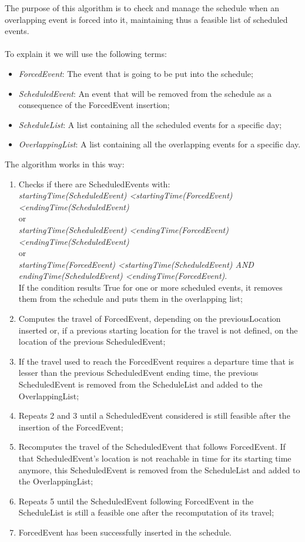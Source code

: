 The purpose of this algorithm is to check and manage the schedule when an overlapping event is forced into it, maintaining thus a feasible list of scheduled events. \\ \\
To explain it we will use the following terms: 
\begin{itemize}
	\item \textit{ForcedEvent}: The event that is going to be put into the schedule;
	\item \textit{ScheduledEvent}: An event that will be removed from the schedule as a consequence of the ForcedEvent insertion;
	\item \textit{ScheduleList}: A list containing all the scheduled events for a specific day;
	\item \textit{OverlappingList}: A list containing all the overlapping events for a specific day.
\end{itemize}
\newpage
\noindent The algorithm works in this way:
\begin{enumerate}
	\item Checks if there are ScheduledEvents with: \\ \textit{startingTime(ScheduledEvent) \textless startingTime(ForcedEvent) \textless endingTime(ScheduledEvent)} \\ or \\ \textit{startingTime(ScheduledEvent) \textless endingTime(ForcedEvent) \textless endingTime(ScheduledEvent)} \\
or \\ \textit{startingTime(ForcedEvent) \textless startingTime(ScheduledEvent) AND \\endingTime(ScheduledEvent) \textless endingTime(ForcedEvent)}. \\
	If the condition results True for one or more scheduled events, it removes them from the schedule and puts them in the overlapping list;
	\item Computes the travel of ForcedEvent, depending on the previousLocation inserted or, if a previous starting location for the travel is not defined, on the location of the previous ScheduledEvent;
	\item If the travel used to reach the ForcedEvent requires a departure time that is lesser than the previous ScheduledEvent ending time, the previous ScheduledEvent is removed from the ScheduleList and added to the OverlappingList;
	\item Repeats 2 and 3 until a ScheduledEvent considered is still feasible after the insertion of the ForcedEvent;
	\item Recomputes the travel of the ScheduledEvent that follows ForcedEvent. If that ScheduledEvent's location is not reachable in time for its starting time anymore, this ScheduledEvent is removed from the ScheduleList and added to the OverlappingList;
	\item Repeats 5 until the ScheduledEvent following ForcedEvent in the ScheduleList is still a feasible one after the recomputation of its travel;
	\item ForcedEvent has been successfully inserted in the schedule.
\end{enumerate}